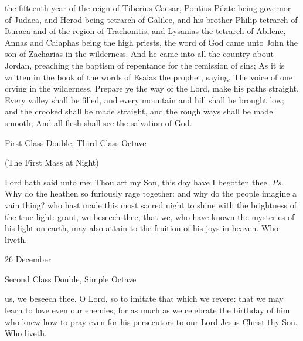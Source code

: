  the fifteenth year of the reign of Tiberius Caesar, Pontius Pilate being governor of Judaea, and Herod being tetrarch of Galilee, and his brother Philip tetrarch of Ituraea and of the region of Trachonitis, and Lysanias the tetrarch of Abilene, Annas and Caiaphas being the high priests, the word of God came unto John the son of Zacharias in the wilderness. And he came into all the country about Jordan, preaching the baptism of repentance for the remission of sins; As it is written in the book of the words of Esaias the prophet, saying, The voice of one crying in the wilderness, Prepare ye the way of the Lord, make his paths straight. Every valley shall be filled, and every mountain and hill shall be brought low; and the crooked shall be made straight, and the rough ways shall be made smooth; And all flesh shall see the salvation of God.

\begin{inhead}
{First Class Double, Third Class Octave}
\end{inhead}
\centerline{\small{(The First Mass at Night)}}

\introit
{} Lord hath said unto me: Thou art my Son, this day have I begotten thee. \textit{Ps.} Why do the heathen so furiously rage together: and why do the people imagine a vain thing?
\collect
{} who hast made this most sacred night to shine with the brightness of the true light: grant, we beseech thee; that we, who have known the mysteries of his light on earth, may also attain to the fruition of his joys in heaven. Who liveth.

\begin{inhead}
{26 December}\par
{Second Class Double, Simple Octave}
\end{inhead}

\collect
 us, we beseech thee, O Lord, so to imitate that which we revere: that we may learn to love even our enemies; for as much as we celebrate the birthday of him who knew how to pray even for his persecutors to our Lord Jesus Christ thy Son. Who liveth.

